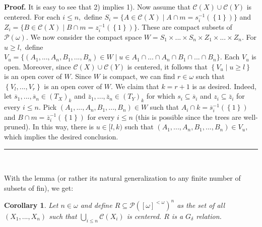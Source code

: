 \documentclass{article}%
\newtheorem{corollary}[theorem]{Corollary}
\newenvironment{proof}[1][Proof]{\noindent\textbf{#1.} }{\ \rule{0.5em}{0.5em}}
\begin{document}
\begin{proof}
It is easy to see that 2) implies 1). Now assume that $\mathcal{C}\left(
X\right)  \cup\mathcal{C}\left(  Y\right)  $ is centered. For each $i\leq n,$
define $S_{i}=\{A\in\mathcal{C}\left(  X\right)  \mid A\cap m=s_{i}%
^{-1}\left(  \left\{  1\right\}  \right)  \}$ and $Z_{i}=\{B\in\mathcal{C}%
\left(  X\right)  \mid B\cap m=z_{i}^{-1}\left(  \left\{  1\right\}  \right)
\}.$ These are compact subsets of $\mathcal{P}\left(  \omega\right)  .$ We now
consider the compact space $W=S_{1}\times...\times S_{n}\times Z_{1}%
\times...\times Z_{n}.$ For $u\geq l,$ define $V_{u}=\{\left(  A_{1}%
,...,A_{n},B_{1},...,B_{n}\right)  \in W\mid u\in A_{1}\cap...\cap A_{n}\cap
B_{1}\cap...\cap B_{n}\}.$ Each $V_{u}$ is open. Moreover, since
$\mathcal{C}\left(  X\right)  \cup\mathcal{C}\left(  Y\right)  $ is centered,
it follows that $\left\{  V_{u}\mid u\geq l\right\}  $ is an open cover of
$W.$ Since $W$ is compact, we can find $r\in\omega$ such that $\left\{
V_{l},...,V_{r}\right\}  $ is an open cover of $W.$ We claim that $k=r+1$ is
as desired. Indeed, let $\overline{s}_{1},...,\overline{s}_{n}\in\left(
T_{X}\right)  _{k}$ and $\overline{z}_{1},...,\overline{z}_{n}\in\left(
T_{Y}\right)  _{k}$ for which $s_{i}\subseteq\overline{s}_{i}$ and
$z_{i}\subseteq\overline{z}_{i}$ for every $i\leq n.$ Pick $\left(
A_{1},...,A_{n},B_{1},...,B_{n}\right)  \in W$ such that $A_{i}\cap
k=\overline{s}_{i}^{-1}\left(  \left\{  1\right\}  \right)  $ and $B\cap
m=\overline{z}_{i}^{-1}\left(  \left\{  1\right\}  \right)  $ for every $i\leq
n$ (this is possible since the trees are well-pruned). In this way, there is
$u\in\lbrack l,k)$ such that $\left(  A_{1},...,A_{n},B_{1},...,B_{n}\right)
\in V_{u},$ which implies the desired conclusion.
\end{proof}

\qquad\qquad\qquad\ \ \ \qquad\ \ \ \ \qquad\ \ 

With the lemma (or rather its natural generalization to any finite number of
subsets of \textsf{fin}), we get:

\begin{corollary}
Let $n\in\omega$ and define $R\subseteq\mathcal{P}\left(  \left[
\omega\right]  ^{<\omega}\right)  ^{n}$ as the set of all $\left(
X_{1},...,X_{n}\right)  $ such that $%
{\textstyle\bigcup\limits_{i\leq n}}
\mathcal{C}\left(  X_{i}\right)  $ is centered. $R$ is a $G_{\delta}$
relation. \label{complejidad strong ppoint}
\end{corollary}
\end{document}
